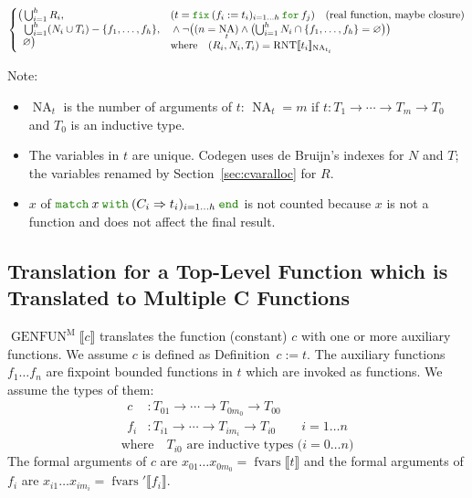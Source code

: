 \documentclass[a4paper,fleqn]{article}
\def\codegen{\textrm{Codegen}}
\newcommand{\kwDefinition}{\mbox{\color{myviolet}\ttfamily Definition}}
\newcommand{\kwmatch}{\mbox{\color{mygreen}\ttfamily match}}
\newcommand{\kwwith}{\mbox{\color{mygreen}\ttfamily with}}
\newcommand{\kwend}{\mbox{\color{mygreen}\ttfamily end}}
\newcommand{\kwfix}{\mbox{\color{mygreen}\ttfamily fix}}
\newcommand{\kwfor}{\mbox{\color{mygreen}\ttfamily for}}
\newcommand{\match}[4]{\kwmatch\:#1\:\kwwith\:(#2 \Rightarrow #3)_{#4}\:\kwend}
\newcommand{\fix}[4]{\kwfix\:(#1 := #2)_{#3}\:\kwfor\:#4}
\DeclareMathOperator{\NA}{NA}
\newcommand{\BRA}[1]{\llbracket #1 \rrbracket}
\DeclareMathOperator{\genfunop}{GENFUN}
\newcommand{\genfunm}[1]{\genfunop^\mathrm{M}\BRA{#1}}
\DeclareMathOperator{\RNTop}{RNT}
\newcommand{\RNT}[2]{\RNTop\BRA{#1}_{#2}}
\newcommand{\secref}[1]{Section~\ref{#1}}
\DeclareMathOperator{\fvarsop}{fvars}
\newcommand{\fvars}[1]{\fvarsop\BRA{#1}}
\newcommand{\fvarsd}[1]{\fvarsop'\BRA{#1}}
\begin{document}
\begin{align*}
\begin{cases}
    \begin{aligned}[t]
      \bigl( & \textstyle\bigcup_{i=1}^h R_i, \\
             & \textstyle\bigcup_{i=1}^h (N_i \cup T_i) - \{f_1,\dotsc, f_h\}, \\
             & \varnothing \bigr)
    \end{aligned} &
      \begin{aligned}[t]
        & (t = \fix{f_i}{t_i}{i=1\ldots h}{f_j}) \quad \text{(real function, maybe closure)} \\
        & {} \wedge \neg \bigl((n = \NA_t) \wedge \bigl(\textstyle\bigcup_{i=1}^h N_i \cap \{f_1,\dotsc, f_h\} = \varnothing\bigr)\bigr) \\
        & \text{where}\quad (R_i, N_i, T_i) = \RNT{t_i}{\NA_{t_i}}
      \end{aligned}
  \end{cases}
\end{align*}
{\small Note:
\begin{itemize}
  \item $\NA_t$ is the number of arguments of $t$: \quad $\NA_t=m$ if $t : T_1 \rightarrow \dotsb \rightarrow T_m \rightarrow T_0$ and $T_0$ is an inductive type.
  \item The variables in $t$ are unique.
    \codegen{} uses de Bruijn's indexes for $N$ and $T$;
    the variables renamed by \secref{sec:cvaralloc} for $R$.
  \item $x$ of $\match{x}{C_i}{t_i}{i=1\ldots h}$ is not counted because $x$ is not a function and does not affect the final result.
\end{itemize}}

\subsection{Translation for a Top-Level Function which is Translated to Multiple C Functions}\label{sec:genfunm}
\raggedright
$\genfunm{c}$ translates the function (constant) $c$ with one or more auxiliary functions.
We assume $c$ is defined as \kwDefinition~$c := t.$
The auxiliary functions $f_1 \ldots f_n$ are fixpoint bounded functions in $t$ which are invoked as functions.
We assume the types of them:
\begin{align*}
  c &: T_{01} \rightarrow \dotsb \rightarrow T_{0m_0} \rightarrow T_{00} \\
  f_i &: T_{i1} \rightarrow \dotsb \rightarrow T_{im_i} \rightarrow T_{i0} && i = 1\ldots n
\end{align*}
\[ \text{where} \quad \text{$T_{i0}$ are inductive types ($i=0\ldots n$)} \]
The formal arguments of $c$ are $x_{01}\ldots x_{0m_0} = \fvars{t}$ and
the formal arguments of $f_i$ are $x_{i1}\ldots x_{im_i} = \fvarsd{f_i}$.
\end{document}
